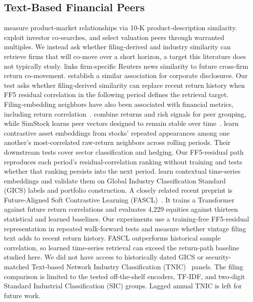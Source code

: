 \documentclass[sigconf,anonymous]{acmart}
\begin{document}
\subsection{Text-Based Financial Peers}
\citet{hoberg2010product,hoberg2016text} measure product-market relationships via
10-K product-description similarity.  \citet{lee2015search} exploit investor
co-searches, and \citet{bhojraj2002peer} select valuation peers through
warranted multiples.
We instead ask whether filing-derived and industry similarity can retrieve firms
that will co-move over a short horizon, a target this literature does not
typically study.
\citet{box2018words} links firm-specific Reuters news similarity to future
cross-firm return co-movement.  \citet{dyer2024textual} establish a similar
association for corporate disclosures.  Our test asks whether filing-derived
similarity can replace recent return history when FF5 residual correlation in
the following period defines the retrieval target.
Filing-embedding neighbors have also been associated with financial metrics,
including return correlation~\citep{vamvourellis2023company}.
\citet{bonne2022peer} combine returns and risk signals for peer grouping, while
SimStock learns peer vectors designed to remain stable over
time~\citep{hwang2023simstock}.  \citet{dolphin2024contrastive} learn
contrastive asset embeddings from stocks' repeated appearances among one
another's most-correlated raw-return neighbors across rolling periods.  Their
downstream tests cover sector classification and hedging.  Our FF5-residual path
reproduces each period's residual-correlation ranking without training and tests
whether that ranking persists into the next period.
\citet{feng2025contextual} learn contextual time-series embeddings and validate
them on Global Industry Classification Standard (GICS) labels and portfolio
construction.  A closely related recent preprint is Future-Aligned Soft
Contrastive Learning (FASCL)~\citep{lee2026fascl}.  It trains a
Transformer against future return correlations and evaluates 4,229 equities
against thirteen statistical and learned baselines.  Our experiments use a
training-free FF5-residual representation in repeated walk-forward tests and
measure whether vintage filing text adds to recent return history.  FASCL
outperforms historical sample correlation, so learned time-series retrieval can
exceed the return-path baseline studied here.
We did not have access to historically dated GICS or security-matched
Text-based Network Industry Classification (TNIC)~\citep{hoberg2016text}
panels.  The filing comparison is limited to the tested off-the-shelf encoders,
TF-IDF, and two-digit Standard Industrial Classification (SIC) groups.  Lagged
annual TNIC is left for future work.
\end{document}
